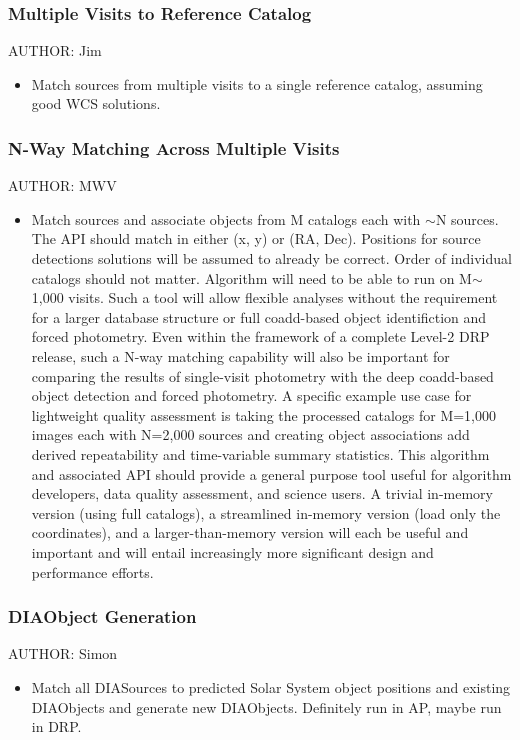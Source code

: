 \subsubsection{Multiple Visits to Reference Catalog}
\label{sec:acJointCalMatching}
AUTHOR: Jim
\begin{itemize}
\item Match sources from multiple visits to a single reference catalog, assuming good WCS solutions.
\end{itemize}

\subsubsection{N-Way Matching Across Multiple Visits}
\label{sec:acNWayMatching}
AUTHOR: MWV
\begin{itemize}
\item Match sources and associate objects from M catalogs each with $\sim$N sources.  The API should match in either (x, y) or (RA, Dec).  Positions for source detections solutions will be assumed to already be correct.  Order of individual catalogs should not matter.  Algorithm will need to be able to run on M$\sim$1,000 visits.  Such a tool will allow flexible analyses without the requirement for a larger database structure or full coadd-based object identifiction and forced photometry.  Even within the framework of a complete Level-2 DRP release, such a N-way matching capability will also be important for comparing the results of single-visit photometry with the deep coadd-based object detection and forced photometry.  A specific example use case for lightweight quality assessment is taking the processed catalogs for M=1,000 images each with N=2,000 sources and creating object associations add derived repeatability and time-variable summary statistics.  This algorithm and associated API should provide a general purpose tool useful for algorithm developers, data quality assessment, and science users.  A trivial in-memory version (using full catalogs), a streamlined in-memory version (load only the coordinates), and a larger-than-memory version will each be useful and important and will entail increasingly more significant design and performance efforts.
\end{itemize}

\subsubsection{DIAObject Generation}
\label{sec:acDIAObjectGeneration}
AUTHOR: Simon
\begin{itemize}
\item Match all DIASources to predicted Solar System object positions and existing DIAObjects and generate new DIAObjects.  Definitely run in AP, maybe run in DRP.
\end{itemize}

